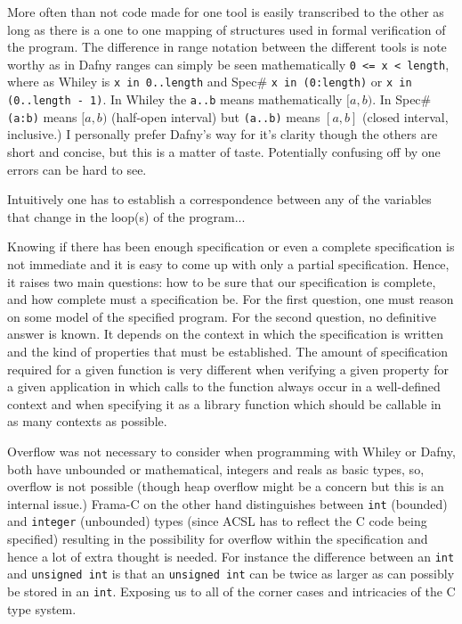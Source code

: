 \documentclass[10pt]{article} %
\begin{document}
More often than not code made for one tool is easily transcribed to the other as long as there is a one to one mapping of structures used in formal verification of the program. The difference in range notation between the different tools is note worthy as in Dafny ranges can simply be seen mathematically \verb/0 <= x < length/, where as Whiley is \verb/x in 0..length/ and Spec\# \verb/x in (0:length)/ or \verb/x in (0..length - 1)/. In Whiley the \verb/a..b/ means mathematically $[a,b)$. In Spec\# \verb/(a:b)/ means  $[a,b)$ (half-open interval) but \verb/(a..b)/ means $[a,b]$ (closed interval, inclusive.) I personally prefer Dafny's way for it's clarity though the others are short and concise, but this is a matter of taste. Potentially confusing off by one errors can be hard to see.

Intuitively one has to establish a correspondence between any of the variables that change in the loop(s) of the program...

Knowing if there has been enough specification or even a complete specification is not immediate and it is easy to come up with only a partial specification. Hence, it raises two main questions: how to be sure that our specification is complete, and how complete must a specification be. For the first question, one must reason on some model of the specified program. For the second question, no definitive answer is known. It depends on the context in which the specification is written and the kind of properties that must be established. The amount of specification required for a given function is very different when verifying a given property for a given application in which calls to the function always occur in a well-defined context and when specifying it as a library function which should be callable in as many contexts as possible.

Overflow was not necessary to consider when programming with Whiley or Dafny, both have unbounded or mathematical, integers and reals as basic types, so, overflow is not possible (though heap overflow might be a concern but this is an internal issue.) Frama-C on the other hand distinguishes between \verb/int/ (bounded) and \verb/integer/ (unbounded) types (since ACSL has to reflect the C code being specified) resulting in the possibility for overflow within the specification and hence a lot of extra thought is needed. For instance the difference between an \verb/int/ and \verb/unsigned int/ is that an \verb/unsigned int/ can be twice as larger as can possibly be stored in an \verb/int/. Exposing us to all of the corner cases and intricacies of the C type system.
\end{document}
